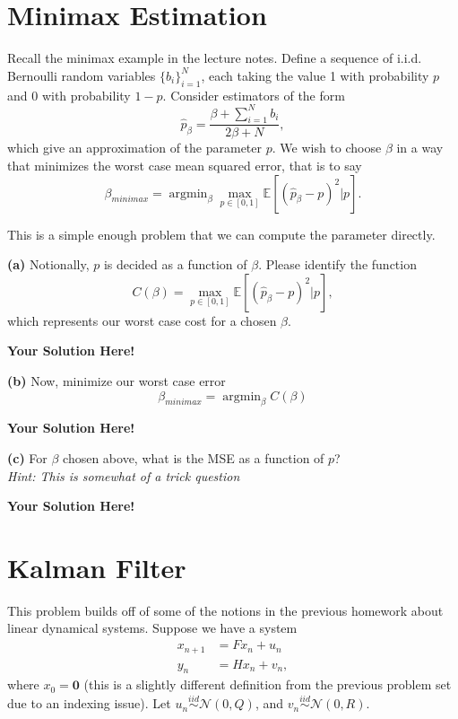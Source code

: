 \documentclass[12pt]{article}
\newcommand{\expect}[1]{\mathbb{E}\left[#1\right]}
\newcommand{\0}{\mathbf{0}}
\newcommand{\1}{\mathbf{1}}
\DeclareMathOperator*{\argmin}{\text{argmin}}
\newcommand{\solspace}{\vspace{3mm} \textbf{Your Solution Here!} \vspace{3mm}}
\begin{document}
\rhead{\today}
\section{Minimax Estimation}
Recall the minimax example in the lecture notes.
Define a sequence of i.i.d. Bernoulli random variables $\{b_i\}_{i=1}^N$, each taking the value 1 with probability $p$ and 0 with probability $1-p$.
Consider estimators of the form
\begin{equation}
    \hat{p}_\beta = \frac{\beta + \sum_{i=1}^N b_i}{2\beta + N},
\end{equation}
which give an approximation of the parameter $p$.
We wish to choose $\beta$ in a way that minimizes the worst case mean squared error, that is to say
\begin{equation}
    \beta_{minimax} = \argmin_{\beta} \max_{p \in [0,1]} \expect{(\hat{p}_\beta - p)^2 | p}.
\end{equation}

This is a simple enough problem that we can compute the parameter directly.

\textbf{(a)} Notionally, $p$ is decided as a function of $\beta$.
Please identify the function
\begin{equation}
    C(\beta) = \max_{p \in [0,1]} \expect{(\hat{p}_\beta - p)^2 | p},
\end{equation}
which represents our worst case cost for a chosen $\beta$.

\solspace

\textbf{(b)} Now, minimize our worst case error
\begin{equation}
    \beta_{minimax} = \argmin_\beta C(\beta)
\end{equation}

\solspace

\textbf{(c)} For $\beta$ chosen above, what is the MSE as a function of $p$? \\
\textit{Hint: This is somewhat of a trick question}

\solspace


\pagebreak
\section{Kalman Filter}
This problem builds off of some of the notions in the previous homework about linear dynamical systems.
Suppose we have a system
\begin{align}
    x_{n+1} &= F x_n + u_n \\
    y_n &= H x_n + v_n,
\end{align}
where $x_0 = \0$ (this is a slightly different definition from the previous problem set due to an indexing issue).
Let $u_n \overset{iid}{\sim} \mathcal{N}(0,Q)$, and $v_n \overset{iid}{\sim} \mathcal{N}(0,R)$.
\end{document}
